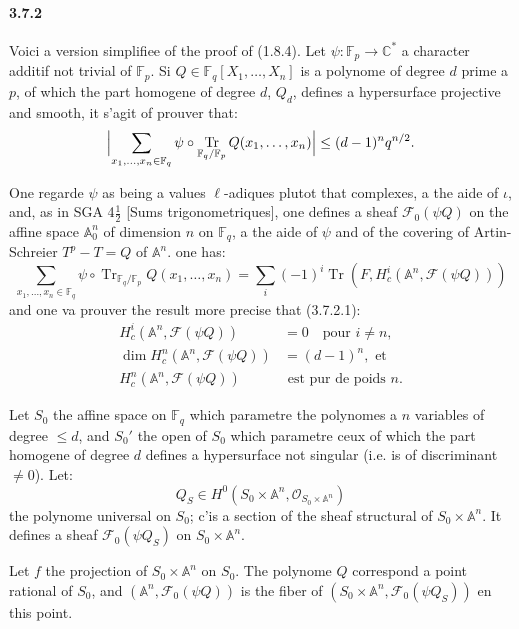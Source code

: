 \documentclass[12pt,a4paper]{article}
\theoremstyle{plain}
\theoremstyle{definition}
\theoremstyle{remark}
\DeclareMathOperator{\Tr}{Tr}
\newcommand{\CC}{{\mathbb{C}}}
\newcommand{\FF}{{\mathbb{F}}}
\renewcommand{\AA}{\ensuremath{\mathbb{A}}}
\begin{document}
\paragraph{3.7.2}
Voici a version simplifiee of the proof of (1.8.4). Let $\psi : \FF_p \to \CC^*$ a character additif not trivial of $\FF_p$. Si $Q \in \FF_q[X_1, \ldots, X_n]$ is a polynome of degree $d$ prime a $p$, of which the part homogene of degree $d$, $Q_d$, defines a hypersurface projective and smooth, it s'agit of prouver that:
\begin{equation}\label{eq:3.7.2.1}
\Bigl| \sum_{x_1, \ldots, x_n \in \FF_q} \psi \circ \Tr_{\FF_q/\FF_p} Q(x_1, \ldots, x_n) \Bigr| \leq (d-1)^n q^{n/2}.
\end{equation}

One regarde $\psi$ as being a values $\ell$-adiques plutot that complexes, a the aide of $\iota$, and, as in SGA 4$\frac{1}{2}$ [Sums trigonometriques], one defines a sheaf $\mathscr{F}_0(\psi Q)$ on the affine space $\AA_0^n$ of dimension $n$ on $\FF_q$, a the aide of $\psi$ and of the covering of Artin-Schreier $T^p - T = Q$ of $\AA^n$. one has:
\begin{equation}\label{eq:3.7.2.2}
\sum_{x_1, \ldots, x_n \in \FF_q} \psi \circ \Tr_{\FF_q/\FF_p} Q(x_1, \ldots, x_n) = \sum_i (-1)^i \Tr(F, H_c^i(\AA^n, \mathscr{F}(\psi Q)))
\end{equation}
and one va prouver the result more precise that (3.7.2.1):
\begin{equation}\label{eq:3.7.2.3}
\begin{aligned}
H_c^i(\AA^n, \mathscr{F}(\psi Q)) &= 0 \quad \text{pour } i \neq n, \\
\dim H_c^n(\AA^n, \mathscr{F}(\psi Q)) &= (d-1)^n, \text{ et} \\
H_c^n(\AA^n, \mathscr{F}(\psi Q)) &\text{ est pur de poids } n.
\end{aligned}
\end{equation}

Let $S_0$ the affine space on $\FF_q$ which parametre the polynomes a $n$ variables of degree $\leq d$, and $S_0'$ the open of $S_0$ which parametre ceux of which the part homogene of degree $d$ defines a hypersurface not singular (i.e. is of discriminant $\neq 0$). Let:
\[ Q_S \in H^0(S_0 \times \AA^n, \mathcal{O}_{S_0 \times \AA^n}) \]
the polynome universal on $S_0$; c'is a section of the sheaf structural of $S_0 \times \AA^n$. It defines a sheaf $\mathscr{F}_0(\psi Q_S)$ on $S_0 \times \AA^n$.

Let $f$ the projection of $S_0 \times \AA^n$ on $S_0$. The polynome $Q$ correspond a point rational of $S_0$, and $(\AA^n, \mathscr{F}_0(\psi Q))$ is the fiber of $(S_0 \times \AA^n, \mathscr{F}_0(\psi Q_S))$ en this point.
\end{document}
